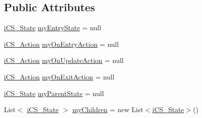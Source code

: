 \subsection*{Public Attributes}
\begin{DoxyCompactItemize}
\item 
\hyperlink{classi_c_s___state}{i\+C\+S\+\_\+\+State} \hyperlink{classi_c_s___state_ad8792148c84ea2831437dcc9ace3fb8b}{my\+Entry\+State} = null
\item 
\hyperlink{classi_c_s___action}{i\+C\+S\+\_\+\+Action} \hyperlink{classi_c_s___state_a25795940aed8d4542c48ffdfd70972c5}{my\+On\+Entry\+Action} = null
\item 
\hyperlink{classi_c_s___action}{i\+C\+S\+\_\+\+Action} \hyperlink{classi_c_s___state_a2f4ccaf8ae0c24bc895b3dcce7a50a01}{my\+On\+Update\+Action} = null
\item 
\hyperlink{classi_c_s___action}{i\+C\+S\+\_\+\+Action} \hyperlink{classi_c_s___state_a447a79c8f7a31dd3d6b63ca9cb61612a}{my\+On\+Exit\+Action} = null
\item 
\hyperlink{classi_c_s___state}{i\+C\+S\+\_\+\+State} \hyperlink{classi_c_s___state_a936f5a63a63d2a17d129bfd0aadaee19}{my\+Parent\+State} = null
\item 
List$<$ \hyperlink{classi_c_s___state}{i\+C\+S\+\_\+\+State} $>$ \hyperlink{classi_c_s___state_a3a6f8c5cd038a625328f2f2bf7db6f16}{my\+Children} = new List$<$\hyperlink{classi_c_s___state}{i\+C\+S\+\_\+\+State}$>$()
\end{DoxyCompactItemize}
